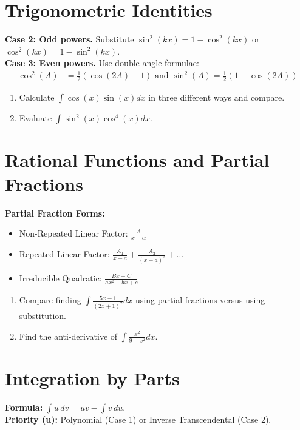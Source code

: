 \documentclass[12pt]{article}
\begin{document}
 \section*{Trigonometric Identities} 

 \noindent \textbf{Case 2: Odd powers.} Substitute $\sin^{2}(kx)=1-\cos^{2}(kx)$ or $\cos^{2}(kx)=1-\sin^{2}(kx)$.  \\
 \noindent \textbf{Case 3: Even powers.} Use double angle formulae: 
 \begin{align*} 
     \cos^{2}(A) &= \frac{1}{2}(\cos(2A)+1) \text{ and } \sin^{2}(A) = \frac{1}{2}(1-\cos(2A)) 
 \end{align*} 

 \begin{enumerate} 
     \item Calculate $\displaystyle \int \cos(x)\sin(x)dx$ in three different ways and compare. 
     \vspace{2cm} 
     \item Evaluate $\displaystyle \int \sin^2(x)\cos^4(x)dx$. 
 \end{enumerate} 

 \pagebreak

 \section*{Rational Functions and Partial Fractions} 

 \noindent \textbf{Partial Fraction Forms:} 
 \begin{itemize} 
     \item Non-Repeated Linear Factor: $\displaystyle \frac{A}{x-\alpha}$ 
     \item Repeated Linear Factor: $\displaystyle \frac{A_{1}}{x-a}+\frac{A_{2}}{(x-a)^{2}}+\dots$ 
     \item Irreducible Quadratic: $\displaystyle \frac{Bx+C}{ax^{2}+bx+c}$ 
 \end{itemize} 

 \begin{enumerate} 
     \item Compare finding $\displaystyle \int\frac{5x-1}{(2x+1)^{2}}dx$ using partial fractions versus using substitution. 
     \vspace{4cm} 
     \item Find the anti-derivative of $\displaystyle \int \frac{x^2}{9-x^2} dx$. 
 \end{enumerate} 

 \section*{Integration by Parts} 
 \noindent \textbf{Formula:} $\displaystyle \int u\, dv = uv - \int v\, du$.  \\
 \noindent \textbf{Priority (u):} Polynomial (Case 1)  or Inverse Transcendental (Case 2). 
\end{document}
